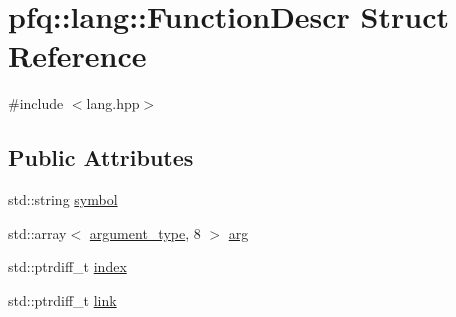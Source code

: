 \hypertarget{structpfq_1_1lang_1_1FunctionDescr}{\section{pfq\+:\+:lang\+:\+:Function\+Descr Struct Reference}
\label{structpfq_1_1lang_1_1FunctionDescr}
}


{\ttfamily \#include $<$lang.\+hpp$>$}

\subsection*{Public Attributes}
\begin{DoxyCompactItemize}
\item 
std\+::string \hyperlink{structpfq_1_1lang_1_1FunctionDescr_a21f51c65f55dddd54de1171d8914c030}{symbol}
\item 
std\+::array$<$ \hyperlink{structpfq_1_1lang_1_1argument__type}{argument\+\_\+type}, 8 $>$ \hyperlink{structpfq_1_1lang_1_1FunctionDescr_af1fe3a86f26dc3f74532ce718a195006}{arg}
\item 
std\+::ptrdiff\+\_\+t \hyperlink{structpfq_1_1lang_1_1FunctionDescr_ae818027f48319f8f4f59d3c47202d883}{index}
\item 
std\+::ptrdiff\+\_\+t \hyperlink{structpfq_1_1lang_1_1FunctionDescr_a09e00f9d57300893f95661b56e6b114e}{link}
\end{DoxyCompactItemize}


